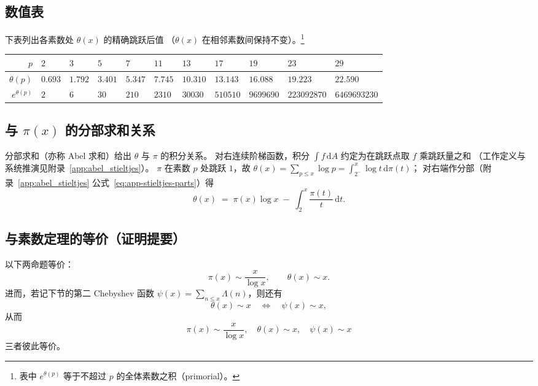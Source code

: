 \subsection{数值表}
 
下表列出各素数处 $\theta(x)$ 的精确跳跃后值
（$\theta(x)$ 在相邻素数间保持不变）。\footnote{表中 $e^{\theta(p)}$ 等于不超过 $p$ 的全体素数之积（primorial）。}
 
\begin{center}
\setlength{\tabcolsep}{3.2pt}
\begin{tabular}{r|llllllllll}
\toprule
$p$ & $2$ & $3$ & $5$ & $7$ & $11$ & $13$ & $17$ & $19$ & $23$ & $29$ \\
\midrule
$\theta(p)$ & $0.693$ & $1.792$ & $3.401$ & $5.347$ & $7.745$ & $10.310$
            & $13.143$ & $16.088$ & $19.223$ & $22.590$ \\
$e^{\theta(p)}$ & $2$ & $6$ & $30$ & $210$ & $2310$ & $30030$
            & $510510$ & $9699690$ & $223092870$ & $6469693230$ \\
\bottomrule
\end{tabular}
\end{center}
 
\subsection{与 \texorpdfstring{$\pi(x)$}{pi(x)} 的分部求和关系}\label{subsec:theta_pi_abel}

分部求和（亦称 Abel 求和）给出 $\theta$ 与 $\pi$ 的积分关系。
对右连续阶梯函数，积分 $\int f\,\mathrm{d}A$ 约定为在跳跃点取 $f$ 乘跳跃量之和
（工作定义与系统推演见附录~\ref{app:abel_stieltjes}）。
$\pi$ 在素数 $p$ 处跳跃 $1$，故
$\theta(x)=\sum_{p\le x}\log p=\int_{2^-}^{x}\log t\,\mathrm{d}\pi(t)$；
对右端作分部（附录~\ref{app:abel_stieltjes} 公式~\eqref{eq:app-stieltjes-parts}）得
\begin{equation}
  \theta(x)
  \;=\;
  \pi(x)\log x
  \;-\;
  \int_2^x \frac{\pi(t)}{t}\,\mathrm{d}t.
\label{eq:theta_pi_abel}
\end{equation}


\subsection{与素数定理的等价（证明提要）}\label{subsec:theta_psi_PNT}

\begin{theorem}{}{}
以下两命题等价：
\[
  \pi(x) \sim \frac{x}{\log x}, \qquad
  \theta(x) \sim x.
\]
进而，若记下节的第二 Chebyshev 函数
$\psi(x)=\sum_{n\le x}\Lambda(n)$，则还有
\[
  \theta(x)\sim x
  \quad\Longleftrightarrow\quad
  \psi(x)\sim x,
\]
从而
\[
  \pi(x)\sim\frac{x}{\log x},
  \quad
  \theta(x)\sim x,
  \quad
  \psi(x)\sim x
\]
三者彼此等价。
\end{theorem}

